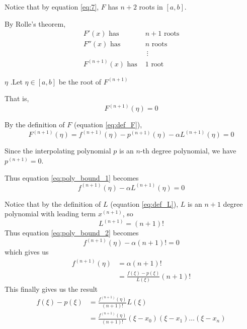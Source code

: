 \documentclass[12pt,letterpaper]{article}
\begin{document}
Notice that by equation \ref{eq:7}, $F$ has $n+2$ roots in $[a,b]$.

By Rolle's theorem,
\begin{align*}
	F'(x) \text{ has } &n+1 \text{ roots} \\
	F''(x) \text{ has } &n \text{ roots} \\
	&\ \vdots \\
	F^{(n+1)}(x) \text{ has } &1 \text{ root}
\end{align*}

\begin{constr}{$\eta$}
.Let $\eta \in [a,b]$ be the root of $F^{(n+1)}$

\medskip
That is,
\begin{equation}
	F^{(n+1)}(\eta) = 0
\end{equation}
\label{constr:mu}
\end{constr}

By the definition of $F$ (equation \ref{eq:def_F}),
\begin{equation}\label{eq:poly_bound_1}
	F^{(n+1)}(\eta) = f^{(n+1)}(\eta) - p^{(n+1)}(\eta) - \alpha L^{(n+1)}(\eta) = 0
\end{equation}

Since the interpolating polynomial $p$ is an $n$-th degree polynomial, we have $p^{(n+1)} = 0$.

Thus equation \ref{eq:poly_bound_1} becomes
\begin{equation}\label{eq:poly_bound_2}
	f^{(n+1)}(\eta) - \alpha L^{(n+1)}(\eta) = 0
\end{equation}

Notice that by the definition of $L$ (equation \ref{eq:def_L}), $L$ is an $n+1$ degree polynomial with leading term $x^{(n+1)}$, so
\begin{equation}
	L^{(n+1)} = (n+1)!
\end{equation}
Thus equation \ref{eq:poly_bound_2} becomes
\begin{equation}
	f^{(n+1)}(\eta) - \alpha (n+1)! = 0
\end{equation}
which gives us
\begin{align}
	f^{(n+1)}(\eta) &= \alpha (n+1)! \\
	&= \frac{f(\xi) - p(\xi)}{L(\xi)} (n+1)!
\end{align}
This finally gives us the result
\begin{align}
	f(\xi) - p(\xi) &= \frac{f^{(n+1)}(\eta)}{(n+1)!} L(\xi) \\
	&= \frac{f^{(n+1)}(\eta)}{(n+1)!} (\xi - x_0)(\xi - x_1) \dots (\xi - x_n)
\end{align}
\end{document}
